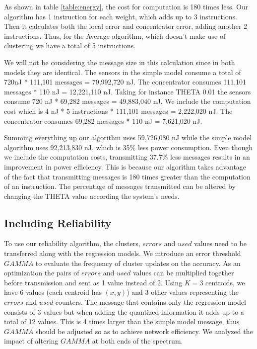 \documentclass{mproj}
\begin{document}
As shown in table \ref{table:energy}, the cost for computation is 180 times less. Our algorithm has 1 instruction for each weight, which adds up to 3 instructions. Then it calculates both the local error and concentrator error, adding another 2 instructions. Thus, for the Average algorithm, which doesn't make use of clustering we have a total of 5 instructions.

We will not be considering the message size in this calculation since in both models they are identical. The sensors in the simple model consume a total of 720nJ * 111,101 messages = 79,992,720 nJ. The concentrator consumes 111,101 messages * 110 nJ = 12,221,110 nJ.
Taking for instance THETA 0.01 the sensors consume 720 nJ * 69,282 messages = 49,883,040 nJ. We include the computation cost which is 4 nJ * 5 instructions * 111,101 messages = 2,222,020 nJ. The concentrator consumes 69,282 messages * 110 nJ = 7,621,020 nJ.

Summing everything up our algorithm uses 59,726,080 nJ while the simple model algorithm uses 92,213,830 nJ, which is 35\% less power consumption. Even though we include the computation costs, transmitting 37.7\% less messages results in an improvement in power efficiency. This is because our algorithm takes advantage of the fact that transmitting messages is 180 times greater than the computation of an instruction. The percentage of messages transmitted can be altered by changing the THETA value according the system's needs.

\subsection{Including Reliability}
To use our reliability algorithm, the clusters, $errors$ and $used$ values need to be transferred along with the regression models. We introduce an error threshold $GAMMA$ to evaluate the frequency of cluster updates on the accuracy. As an optimization the pairs of $errors$ and $used$ values can be multiplied together before transmission and sent as 1 value instead of 2. Using $K=3$ centroids, we have 6 values (each centroid has $(x,y)$) and 3 other values representing the $errors$ and $used$ counters. The message that contains only the regression model consists of 3 values but when adding the quantized information it adds up to a total of 12 values. This is 4 times larger than the simple model message, thus $GAMMA$ should be adjusted so as to achieve network efficiency. We analyzed the impact of altering $GAMMA$ at both ends of the spectrum.
\end{document}
